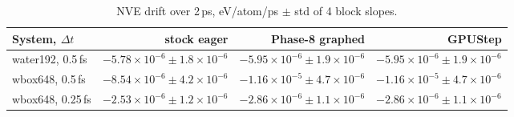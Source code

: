 \begin{table}[h]
\centering
\caption{NVE drift over 2\,ps, eV/atom/ps $\pm$ std of 4 block slopes.}
\label{tab:drift9}
\small
\begin{tabular}{lrrr}
\toprule
System, $\Delta t$ & stock eager & Phase-8 graphed & GPUStep \\
\midrule
water192, 0.5\,fs & $-5.78\times10^{-6}\pm1.8\times10^{-6}$ & $-5.95\times10^{-6}\pm1.9\times10^{-6}$ & $-5.95\times10^{-6}\pm1.9\times10^{-6}$ \\
wbox648, 0.5\,fs & $-8.54\times10^{-6}\pm4.2\times10^{-6}$ & $-1.16\times10^{-5}\pm4.7\times10^{-6}$ & $-1.16\times10^{-5}\pm4.7\times10^{-6}$ \\
wbox648, 0.25\,fs & $-2.53\times10^{-6}\pm1.2\times10^{-6}$ & $-2.86\times10^{-6}\pm1.1\times10^{-6}$ & $-2.86\times10^{-6}\pm1.1\times10^{-6}$ \\
\bottomrule
\end{tabular}
\end{table}

